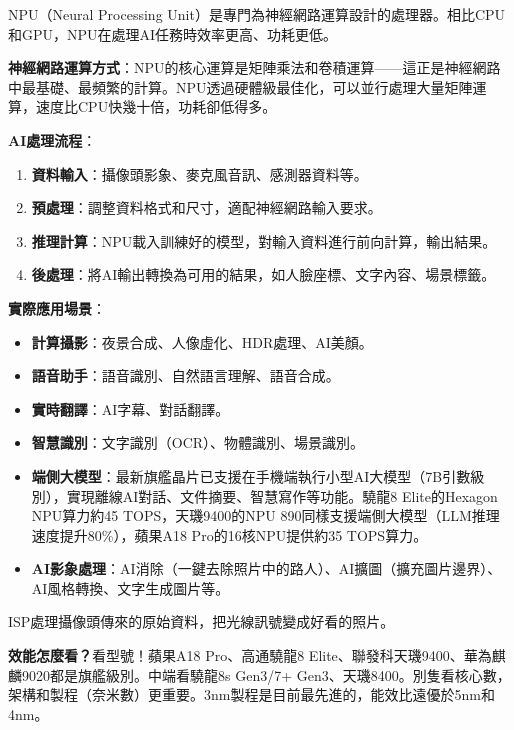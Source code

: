 
NPU（Neural Processing Unit）是專門為神經網路運算設計的處理器。相比CPU和GPU，NPU在處理AI任務時效率更高、功耗更低。

\textbf{神經網路運算方式}：NPU的核心運算是矩陣乘法和卷積運算——這正是神經網路中最基礎、最頻繁的計算。NPU透過硬體級最佳化，可以並行處理大量矩陣運算，速度比CPU快幾十倍，功耗卻低得多。

\textbf{AI處理流程}：

\begin{enumerate}
  \item \textbf{資料輸入}：攝像頭影象、麥克風音訊、感測器資料等。
  \item \textbf{預處理}：調整資料格式和尺寸，適配神經網路輸入要求。
  \item \textbf{推理計算}：NPU載入訓練好的模型，對輸入資料進行前向計算，輸出結果。
  \item \textbf{後處理}：將AI輸出轉換為可用的結果，如人臉座標、文字內容、場景標籤。
\end{enumerate}

\textbf{實際應用場景}：

\begin{itemize}
  \item \textbf{計算攝影}：夜景合成、人像虛化、HDR處理、AI美顏。
  \item \textbf{語音助手}：語音識別、自然語言理解、語音合成。
  \item \textbf{實時翻譯}：AI字幕、對話翻譯。
  \item \textbf{智慧識別}：文字識別（OCR）、物體識別、場景識別。
  \item \textbf{端側大模型}：最新旗艦晶片已支援在手機端執行小型AI大模型（7B引數級別），實現離線AI對話、文件摘要、智慧寫作等功能。驍龍8 Elite的Hexagon NPU算力約45 TOPS，天璣9400的NPU 890同樣支援端側大模型（LLM推理速度提升80\%），蘋果A18 Pro的16核NPU提供約35 TOPS算力。
  \item \textbf{AI影象處理}：AI消除（一鍵去除照片中的路人）、AI擴圖（擴充圖片邊界）、AI風格轉換、文字生成圖片等。
\end{itemize}


ISP處理攝像頭傳來的原始資料，把光線訊號變成好看的照片。

\textbf{效能怎麼看？}看型號！蘋果A18 Pro、高通驍龍8 Elite、聯發科天璣9400、華為麒麟9020都是旗艦級別。中端看驍龍8s Gen3/7+ Gen3、天璣8400。別隻看核心數，架構和製程（奈米數）更重要。3nm製程是目前最先進的，能效比遠優於5nm和4nm。


